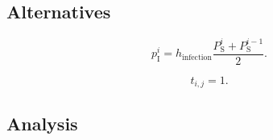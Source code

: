 \documentclass[12pt]{article}
\begin{document}
\subsection{Alternatives}

\begin{equation}
  p_{\mathrm{I}}^i = h_{\text{infection}}
  \frac{P_{\mathrm{S}}^i + P_{\mathrm{S}}^{i - 1}}{2}.
\end{equation}

\begin{equation}
  t_{i, j} = 1.
\end{equation}


\subsection{Analysis}
\end{document}
